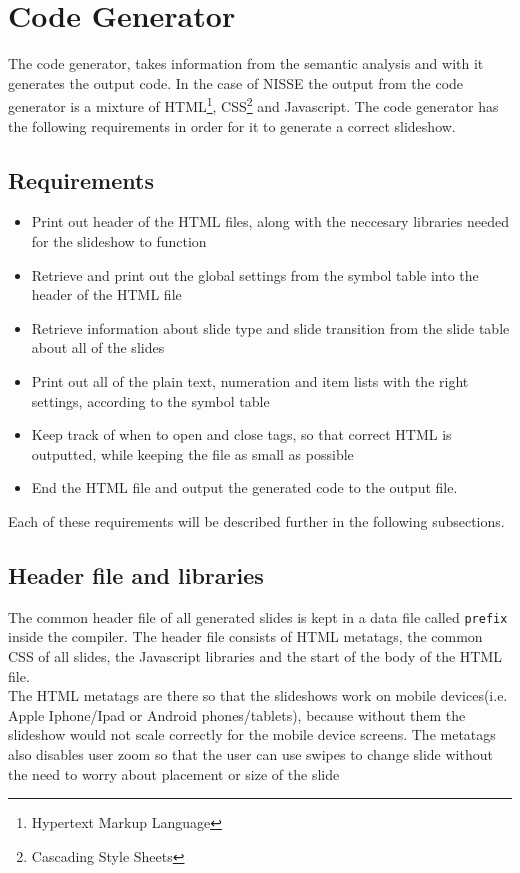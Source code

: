 \chapter{Code Generator}

The code generator, takes information from the semantic analysis and with it generates the output code. In the case of NISSE the output from the code generator is a mixture of HTML\footnote{Hypertext Markup Language}, CSS\footnote{Cascading Style Sheets} and Javascript. The code generator has the following requirements in order for it to generate a correct slideshow.

\section{Requirements}
\begin{itemize}
  \item Print out header of the HTML files, along with the neccesary libraries needed for the slideshow to function
  \item Retrieve and print out the global settings from the symbol table into the header of the HTML file
  \item Retrieve information about slide type and slide transition from the slide table about all of the slides
  \item Print out all of the plain text, numeration and item lists with the right settings, according to the symbol table
  \item Keep track of when to open and close tags, so that correct HTML is outputted, while keeping the file as small as possible
  \item End the HTML file and output the generated code to the output file.
\end{itemize}
Each of these requirements will be described further in the following subsections.

\section{Header file and libraries}
The common header file of all generated slides is kept in a data file called \texttt{prefix} inside the compiler. The header file consists of HTML metatags, the common CSS of all slides, the Javascript libraries and the start of the body of the HTML file. \\

The HTML metatags are there so that the slideshows work on mobile devices(i.e. Apple Iphone/Ipad or Android phones/tablets), because without them the slideshow would not scale correctly for the mobile device screens. The metatags also disables user zoom so that the user can use swipes to change slide without the need to worry about placement or size of the slide\\

